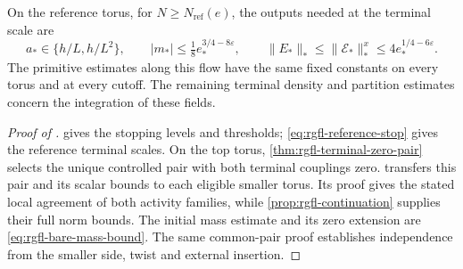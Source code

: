 On the reference torus, for $N\ge N_{\mathrm{ref}}(e)$,
the outputs needed at the terminal scale are
\begin{equation}\label{eq:rgfl-reference-terminal-input}
 a_*\in\{h/L,h/L^2\},\qquad
 |m_*|\le\tfrac18e_*^{3/4-8\varepsilon},\qquad
 \|E_*\|_*\le\|\mathscr E_*\|_*^x
                                 \le4e_*^{1/4-6\varepsilon}.
\end{equation}
The primitive estimates along this flow have the
same fixed constants on every torus and at every
cutoff. The remaining terminal density and partition
estimates concern the integration of these fields.



\begin{proof}[Proof of ]
 gives the stopping levels and thresholds;
\eqref{eq:rgfl-reference-stop} gives the reference terminal scales.
On the top torus, \cref{thm:rgfl-terminal-zero-pair} selects the unique
controlled pair with both terminal couplings zero.
 transfers this pair and its scalar bounds
to each eligible smaller torus. Its proof gives the stated local
agreement of both activity families, while
\cref{prop:rgfl-continuation} supplies their full norm bounds.
The initial mass estimate and its zero extension are
\eqref{eq:rgfl-bare-mass-bound}. The same common-pair proof establishes
independence from the smaller side, twist and external insertion.
\end{proof}
